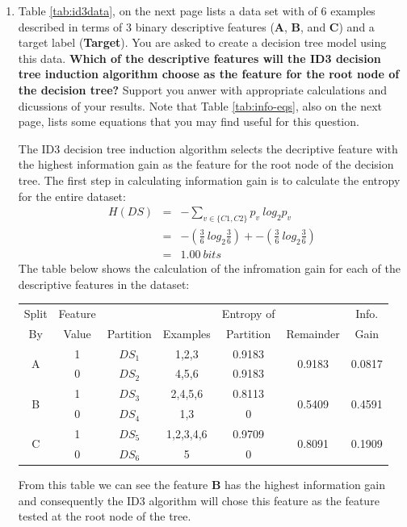 \documentclass[--SOLUTION-OPTION--]{ditpaper}
\begin{document}
\begin{enumerate}
\begin{enumerate}
     \end{enumerate}

		\item Table \ref{tab:id3data}, on the next page lists a data set with of 6 examples described in terms of 3 binary descriptive features (\textbf{A}, \textbf{B}, and \textbf{C}) and a target label (\textbf{Target}). You are asked to create a decision tree model using this data. \textbf{Which of the descriptive features will the ID3 decision tree induction algorithm choose as the feature for the root node of the decision tree?} Support you anwer with appropriate calculations and dicussions of your results. Note that Table \ref{tab:info-eqs}, also on the next page, lists some equations that you may find useful for this question.		
		\begin{answer}
		The ID3 decision tree induction algorithm selects the decriptive feature with the highest information gain as the feature for the root node of the decision tree.  The first step in calculating information gain is to calculate the entropy for the entire dataset:
	\begin{eqnarray*}
H\left(DS\right) &=& - \sum_{v \in \{C1,C2\}} p_v ~ log_2 p_v\\
		&=& -\left(\frac{3}{6}~ log_2 \frac{3}{6}\right) + -\left(\frac{3}{6} ~log_2 \frac{3}{6}\right)\\
		&=& 1.00~bits
	\end{eqnarray*}
	The table below shows the calculation of the infromation gain for each of the descriptive features in the dataset:
		\begin{scriptsize}
\begin{tabular}{ccccccc}
Split & Feature &              &  & Entropy of &  & Info.\\
By & Value & Partition  & Examples & Partition & Remainder & Gain\\
\hline
\multirow{2}{*}{A} & 1 & $DS_1$  & 1,2,3 & 0.9183 & \multirow{2}{*}{0.9183} & \multirow{2}{*}{0.0817}\\
 & 0 & $DS_2$ & 4,5,6 & 0.9183 &  & \\
\hline
\multirow{2}{*}{B} & 1 & $DS_3$ & 2,4,5,6 & 0.8113 & \multirow{2}{*}{0.5409} & \multirow{2}{*}{0.4591}\\
& 0 & $DS_4$ & 1,3 & 0 &  & \\
\hline
\multirow{2}{*}{C} & 1 & $DS_5$ & 1,2,3,4,6 & 0.9709 & \multirow{2}{*}{0.8091} & \multirow{2}{*}{0.1909}\\
& 0 & $DS_6$ & 5 & 0 &  & \\
\hline
\end{tabular}
	\end{scriptsize}
	From this table we can see the feature \textbf{B} has the highest information gain and consequently the ID3 algorithm will chose this feature as the feature tested at the root node of the tree.
		\end{answer}


\end{enumerate}
\end{document}

